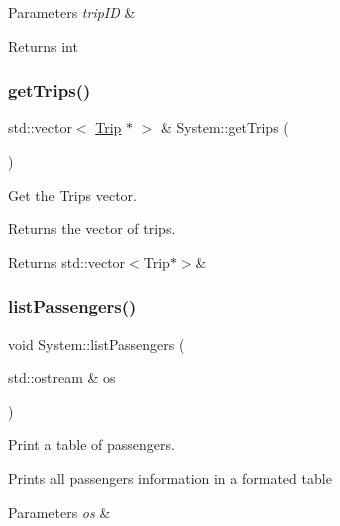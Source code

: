 \begin{DoxyParams}{Parameters}
{\em trip\+ID} & \\
\hline
\end{DoxyParams}
\begin{DoxyReturn}{Returns}
int 
\end{DoxyReturn}
\mbox{\label{classSystem_a97b3ac8c8d84fecbdd2c49df5e4b51bf}} 
\subsubsection{\texorpdfstring{get\+Trips()}{getTrips()}}
{\footnotesize\ttfamily std\+::vector$<$ \mbox{\hyperlink{classTrip}{Trip}} $\ast$ $>$ \& System\+::get\+Trips (\begin{DoxyParamCaption}{ }\end{DoxyParamCaption})}



Get the Trips vector. 

Returns the vector of trips.

\begin{DoxyReturn}{Returns}
std\+::vector$<$\+Trip$\ast$$>$\& 
\end{DoxyReturn}
\mbox{\label{classSystem_a23c0b01d0e84fa4665ce85203ce6747b}} 
\subsubsection{\texorpdfstring{list\+Passengers()}{listPassengers()}}
{\footnotesize\ttfamily void System\+::list\+Passengers (\begin{DoxyParamCaption}\item[{std\+::ostream \&}]{os }\end{DoxyParamCaption})}



Print a table of passengers. 

Prints all passengers\textquotesingle{} information in a formated table


\begin{DoxyParams}{Parameters}
{\em os} & \\
\hline
\end{DoxyParams}
\mbox{\label{classSystem_a06041827a7b47ad06eee9d121e42590c}} 

